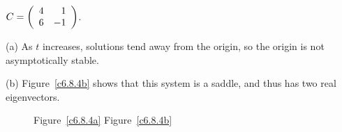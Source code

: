 \documentclass{ximera}
\begin{document}
\begin{computerExercise} \label{c6.8.4b}
$C=\left(\begin{array}{rr} 4 & 1\\ 6 &-1\end{array}\right)$.

\begin{solution}

(a) As $t$ increases, solutions tend away from the origin, so the origin
is not asymptotically stable.

(b) Figure~\ref{c6.8.4b} shows that this system is a saddle, and thus
has two real eigenvectors.

\begin{figure}[htb]
                       \centerline{%
                       }
                \centerline{Figure~\ref{c6.8.4a}\hspace{2.1in}
Figure~\ref{c6.8.4b}}
\end{figure}




\end{solution}
\end{computerExercise}
\end{document}
